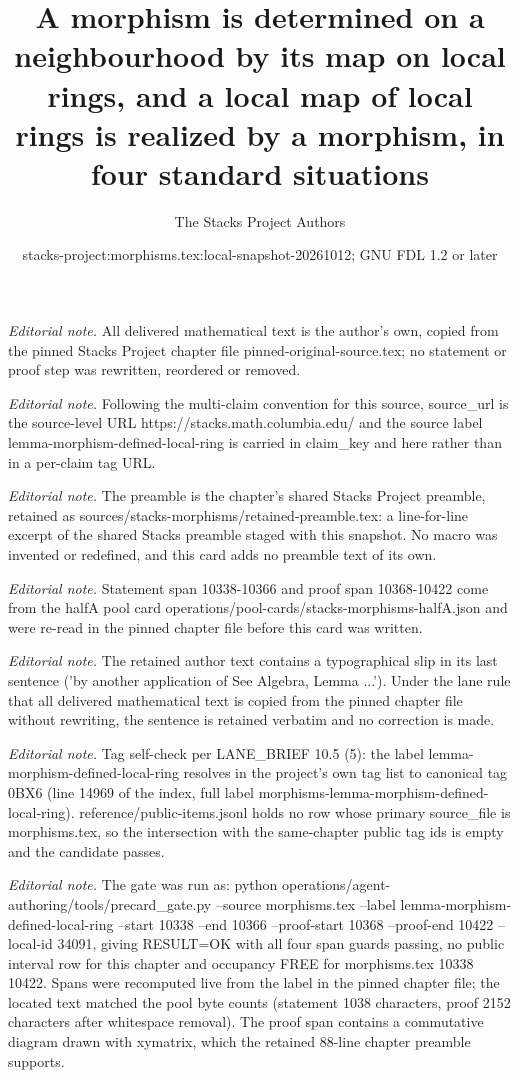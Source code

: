 \documentclass[10pt,a4paper]{amsart}
\title{A morphism is determined on a neighbourhood by its map on local rings, and a local map of local rings is realized by a morphism, in four standard situations}
\author{The Stacks Project Authors}
\date{stacks-project:morphisms.tex:local-snapshot-20261012; GNU FDL 1.2 or later}
\theoremstyle{plain}
\theoremstyle{definition}
\theoremstyle{remark}
\numberwithin{equation}{subsection}
\begin{document}
\maketitle
\noindent\textit{Editorial note.} All delivered mathematical text is the author's own, copied from the pinned Stacks Project chapter file pinned-original-source.tex; no statement or proof step was rewritten, reordered or removed.\par\medskip
\noindent\textit{Editorial note.} Following the multi-claim convention for this source, source\_url is the source-level URL https://stacks.math.columbia.edu/ and the source label lemma-morphism-defined-local-ring is carried in claim\_key and here rather than in a per-claim tag URL.\par\medskip
\noindent\textit{Editorial note.} The preamble is the chapter's shared Stacks Project preamble, retained as sources/stacks-morphisms/retained-preamble.tex: a line-for-line excerpt of the shared Stacks preamble staged with this snapshot. No macro was invented or redefined, and this card adds no preamble text of its own.\par\medskip
\noindent\textit{Editorial note.} Statement span 10338-10366 and proof span 10368-10422 come from the halfA pool card operations/pool-cards/stacks-morphisms-halfA.json and were re-read in the pinned chapter file before this card was written.\par\medskip
\noindent\textit{Editorial note.} The retained author text contains a typographical slip in its last sentence ('by another application of See Algebra, Lemma ...'). Under the lane rule that all delivered mathematical text is copied from the pinned chapter file without rewriting, the sentence is retained verbatim and no correction is made.\par\medskip
\noindent\textit{Editorial note.} Tag self-check per LANE\_BRIEF 10.5 (5): the label lemma-morphism-defined-local-ring resolves in the project's own tag list to canonical tag 0BX6 (line 14969 of the index, full label morphisms-lemma-morphism-defined-local-ring). reference/public-items.jsonl holds no row whose primary source\_file is morphisms.tex, so the intersection with the same-chapter public tag ids is empty and the candidate passes.\par\medskip
\noindent\textit{Editorial note.} The gate was run as: python operations/agent-authoring/tools/precard\_gate.py --source morphisms.tex --label lemma-morphism-defined-local-ring --start 10338 --end 10366 --proof-start 10368 --proof-end 10422 --local-id 34091, giving RESULT=OK with all four span guards passing, no public interval row for this chapter and occupancy FREE for morphisms.tex 10338 10422. Spans were recomputed live from the label in the pinned chapter file; the located text matched the pool byte counts (statement 1038 characters, proof 2152 characters after whitespace removal). The proof span contains a commutative diagram drawn with xymatrix, which the retained 88-line chapter preamble supports.\par\medskip
\end{document}
